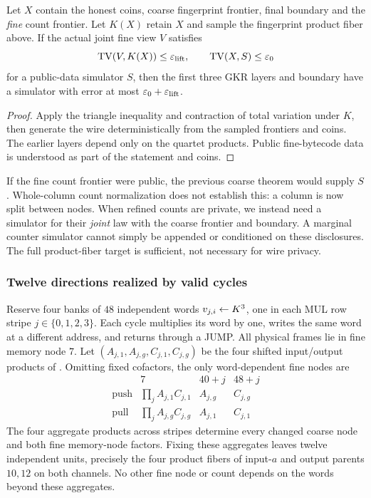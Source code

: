 \begin{lemma}
Let $X$ contain the honest coins, coarse fingerprint frontier, final boundary and the \emph{fine} count frontier. Let $K(X)$ retain $X$ and sample the fingerprint product fiber above. If the actual joint fine view $V$ satisfies
\[
 \operatorname{TV}(V,K(X))\le\varepsilon_{\rm lift},
 \qquad \operatorname{TV}(X,S)\le\varepsilon_0
\]
for a public-data simulator $S$, then the first three GKR layers and boundary have a simulator with error at most $\varepsilon_0+\varepsilon_{\rm lift}$.
\end{lemma}
\begin{proof}
Apply the triangle inequality and contraction of total variation under $K$, then generate the wire deterministically from the sampled frontiers and coins. The earlier layers depend only on the quartet products. Public fine-bytecode data is understood as part of the statement and coins.
\end{proof}

If the fine count frontier were public, the previous coarse theorem would supply $S$. Whole-column count normalization does not establish this: a column is now split between nodes. When refined counts are private, we instead need a simulator for their \emph{joint} law with the coarse frontier and boundary. A marginal counter simulator cannot simply be appended or conditioned on these disclosures. The full product-fiber target is sufficient, not necessary for wire privacy.

\subsubsection{Twelve directions realized by valid cycles}

Reserve four banks of $48$ independent words $v_{j,i}\gets K^3$, one in each MUL row stripe $j\in\{0,1,2,3\}$. Each cycle multiplies its word by one, writes the same word at a different address, and returns through a JUMP. All physical frames lie in fine memory node $7$. Let $(A_{j,1},A_{j,g},C_{j,1},C_{j,g})$ be the four shifted input/output products of . Omitting fixed cofactors, the only word-dependent fine nodes are
\[
\begin{array}{c|ccc}
 &7&40+j&48+j\\\hline
 \text{push}&\prod_j A_{j,1}C_{j,1}&A_{j,g}&C_{j,g}\\
 \text{pull}&\prod_j A_{j,g}C_{j,g}&A_{j,1}&C_{j,1}
\end{array}
\]
The four aggregate products across stripes determine every changed coarse node and both fine memory-node factors. Fixing these aggregates leaves twelve independent units, precisely the four product fibers of input-$a$ and output parents $10,12$ on both channels. No other fine node or count depends on the words beyond these aggregates.

